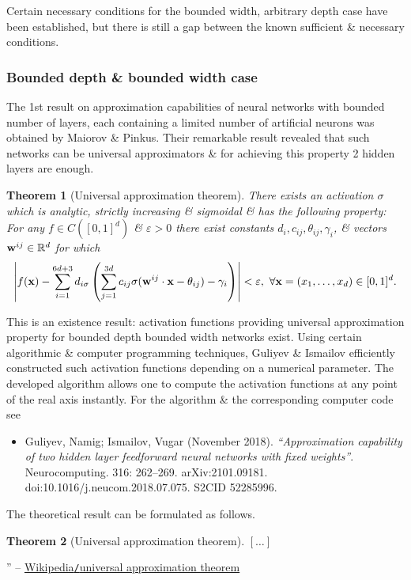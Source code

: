 \documentclass{article}
\newtheorem{theorem}{Theorem}
\begin{document}
Certain necessary conditions for the bounded width, arbitrary depth case have been established, but there is still a gap between the known sufficient \& necessary conditions.

\subsubsection{Bounded depth \& bounded width case}
The 1st result on approximation capabilities of neural networks with bounded number of layers, each containing a limited number of artificial neurons was obtained by Maiorov \& Pinkus. Their remarkable result revealed that such networks can be universal approximators \& for achieving this property 2 hidden layers are enough.

\begin{theorem}[Universal approximation theorem]
	There exists an activation $\sigma$ which is analytic, strictly increasing \& sigmoidal \& has the following property: For any $f\in C([0,1]^d)$ \& $\varepsilon > 0$ there exist constants $d_i,c_{ij},\theta_{ij},\gamma_i$, \& vectors ${\bf w}^{ij}\in\mathbb{R}^d$ for which
	\begin{equation*}
		\left|f({\bf x}) - \sum_{i=1}^{6d + 3} d_{i\sigma}\left(\sum_{j=1}^{3d} c_{ij}\sigma({\bf w}^{ij}\cdot{\bf x} - \theta_{ij}) - \gamma_i\right)\right| < \varepsilon,\ \forall{\bf x} = (x_1,\ldots,x_d)\in[0,1]^d.
	\end{equation*}
\end{theorem}
This is an existence result: activation functions providing universal approximation property for bounded depth bounded width networks exist. Using certain algorithmic \& computer programming techniques, Guliyev \& Ismailov efficiently constructed such activation functions depending on a numerical parameter. The developed algorithm allows one to compute the activation functions at any point of the real axis instantly. For the algorithm \& the corresponding computer code see
\begin{itemize}
	\item {\sc Guliyev, Namig; Ismailov, Vugar} (November 2018). {\it``Approximation capability of two hidden layer feedforward neural networks with fixed weights''}. Neurocomputing. 316: 262--269. arXiv:2101.09181. doi:10.1016/j.neucom.2018.07.075. S2CID 52285996.
\end{itemize}
The theoretical result can be formulated as follows.

\begin{theorem}[Universal approximation theorem]
	$[\ldots]$
\end{theorem}
'' -- \href{https://en.wikipedia.org/wiki/Universal_approximation_theorem}{Wikipedia{\tt/}universal approximation theorem}
\end{document}
